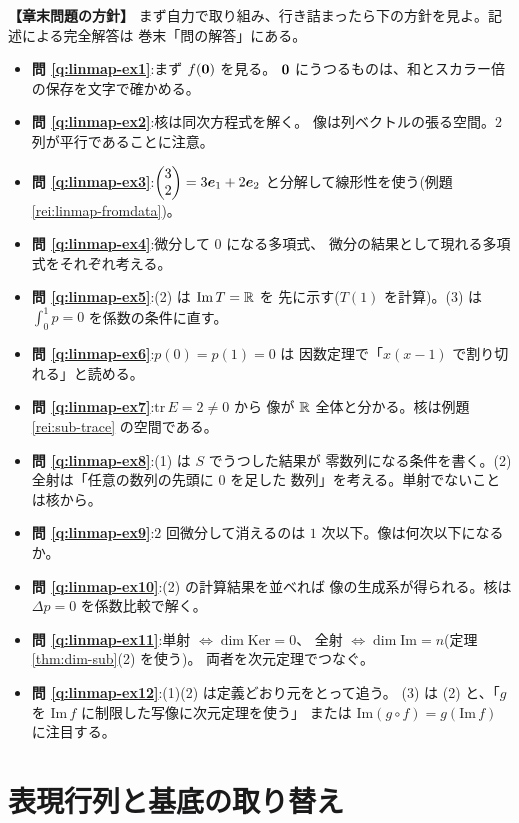 \bigskip
{\small
\noindent\textbf{【章末問題の方針】}\quad
まず自力で取り組み、行き詰まったら下の方針を見よ。記述による完全解答は
巻末「問の解答」にある。
\begin{itemize}
\item \textbf{問 \ref{q:linmap-ex1}}:まず $f(\bm{0})$ を見る。
$\bm{0}$ にうつるものは、和とスカラー倍の保存を文字で確かめる。
\item \textbf{問 \ref{q:linmap-ex2}}:核は同次方程式を解く。
像は列ベクトルの張る空間。$2$ 列が平行であることに注意。
\item \textbf{問 \ref{q:linmap-ex3}}:$\begin{pmatrix}3 \\ 2\end{pmatrix} = 3\bm{e}_1 + 2\bm{e}_2$
と分解して線形性を使う(例題 \ref{rei:linmap-fromdata})。
\item \textbf{問 \ref{q:linmap-ex4}}:微分して $0$ になる多項式、
微分の結果として現れる多項式をそれぞれ考える。
\item \textbf{問 \ref{q:linmap-ex5}}:(2) は $\mathrm{Im}\,T = \mathbb{R}$ を
先に示す($T(1)$ を計算)。(3) は $\int_0^1 p = 0$ を係数の条件に直す。
\item \textbf{問 \ref{q:linmap-ex6}}:$p(0) = p(1) = 0$ は
因数定理で「$x(x - 1)$ で割り切れる」と読める。
\item \textbf{問 \ref{q:linmap-ex7}}:$\mathrm{tr}\,E = 2 \neq 0$ から
像が $\mathbb{R}$ 全体と分かる。核は例題 \ref{rei:sub-trace} の空間である。
\item \textbf{問 \ref{q:linmap-ex8}}:(1) は $S$ でうつした結果が
零数列になる条件を書く。(2) 全射は「任意の数列の先頭に $0$ を足した
数列」を考える。単射でないことは核から。
\item \textbf{問 \ref{q:linmap-ex9}}:$2$ 回微分して消えるのは
$1$ 次以下。像は何次以下になるか。
\item \textbf{問 \ref{q:linmap-ex10}}:(2) の計算結果を並べれば
像の生成系が得られる。核は $\Delta p = 0$ を係数比較で解く。
\item \textbf{問 \ref{q:linmap-ex11}}:単射 $\iff \dim \mathrm{Ker} = 0$、
全射 $\iff \dim \mathrm{Im} = n$(定理 \ref{thm:dim-sub}(2) を使う)。
両者を次元定理でつなぐ。
\item \textbf{問 \ref{q:linmap-ex12}}:(1)(2) は定義どおり元をとって追う。
(3) は (2) と、「$g$ を $\mathrm{Im}\,f$ に制限した写像に次元定理を使う」
または $\mathrm{Im}(g \circ f) = g(\mathrm{Im}\,f)$ に注目する。
\end{itemize}
}

\chapter{表現行列と基底の取り替え}\label{chap:repmat}

